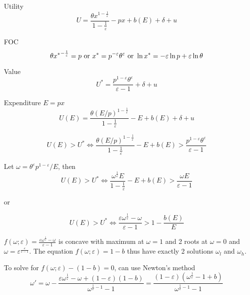 \documentclass[10pt,a4paper]{article}
\author{Duong Hai Long}
\begin{document}
Utility
\[U = \frac{\theta x^{1-\frac{1}{\varepsilon}}}{1-\frac{1}{\varepsilon}} - px + b(E) + \delta + u\]

FOC
\[\theta {x^*}^{-\frac{1}{\varepsilon}} = p \hbox{ or } x^* = p^{-\varepsilon}\theta^\varepsilon \hbox{ or } \ln x^* = -\varepsilon \ln p + \varepsilon \ln \theta \]

Value
\[U^* = \frac{p^{1-\varepsilon} \theta^{\varepsilon}}{\varepsilon-1} + \delta + u\]

Expenditure $E=px$ 
\[U(E) = \frac{\theta (E/p)^{1-\frac{1}{\varepsilon}}}{1-\frac{1}{\varepsilon}} - E + b(E) + \delta + u\]

\[U(E) > U^* \Leftrightarrow \frac{\theta (E/p)^{1-\frac{1}{\varepsilon}}}{1-\frac{1}{\varepsilon}} - E + b(E) > \frac{p^{1-\varepsilon} \theta^{\varepsilon}}{\varepsilon-1}\]

Let $\omega = \theta^\varepsilon p^{1-\varepsilon}/E$, then
\[U(E) > U^* \Leftrightarrow \frac{\omega^{\frac{1}{\varepsilon}} E}{1-\frac{1}{\varepsilon}} - E + b(E) > \frac{\omega E}{\varepsilon-1}\]

or 

\[U(E) > U^* \Leftrightarrow \frac{\varepsilon \omega^{\frac{1}{\varepsilon}} - \omega}{\varepsilon - 1} > 1 - \frac{b(E)}{E} \]

$f(\omega;\varepsilon) = \frac{\varepsilon \omega^{\frac{1}{\varepsilon}} - \omega}{\varepsilon - 1}$ is concave with maximum at $\omega = 1$ and 2 roots at $\omega = 0$ and $\omega = \varepsilon^{\frac{\varepsilon}{\varepsilon-1}}$. The equation $f(\omega;\varepsilon) = 1 - b$ thus have exactly 2 solutions $\omega_l$ and $\omega_h$.



To solve for $f(\omega;\varepsilon) - (1-b) = 0$, can use Newton's method
\[\omega' = \omega - \frac{\varepsilon\omega^\frac{1}{\varepsilon} - \omega + (1-\varepsilon)(1-b)}{\omega^{\frac{1}{\varepsilon}-1}-1} = \frac{(1-\varepsilon)(\omega^{\frac{1}{\varepsilon}}-1+b)}{\omega^{\frac{1}{\varepsilon}-1}-1}\]
\end{document}
